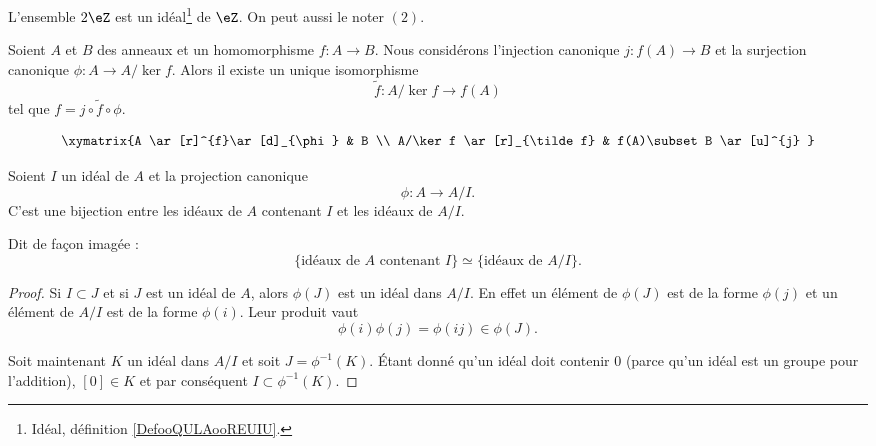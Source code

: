 \begin{lemma}       \label{LEMooQAYSooCYJXkC}
	L'ensemble \( 2\eZ\) est un idéal\footnote{Idéal, définition \ref{DefooQULAooREUIU}.} de \( \eZ\). On peut aussi le noter \( (2) \).
\end{lemma}

\begin{proposition}   \label{PROPooJALPooHFIObB}
	Soient \( A\) et \( B\) des anneaux et un homomorphisme \( f\colon A\to B\). Nous considérons l'injection canonique \( j\colon f(A)\to B\) et la surjection canonique \( \phi\colon A\to A/\ker f\). Alors il existe un unique isomorphisme
	\begin{equation}
		\tilde f \colon A/\ker f\to f(A)
	\end{equation}
	tel que \( f=j\circ\tilde f\circ\phi\).

	\begin{equation}
		\xymatrix{%
			A \ar[r]^{f}\ar[d]_{\phi}       &   B                         \\
			A/\ker f    \ar[r]_{\tilde f}   &   f(A)\subset B \ar[u]^{j}
		}
	\end{equation}
\end{proposition}

\begin{proposition}     \label{PropIJJIdsousphi}
	Soient \( I\) un idéal de \( A\) et la projection canonique
	\begin{equation}
		\phi\colon A\to A/I.
	\end{equation}
	C'est une bijection entre les idéaux de \( A\) contenant \( I\) et les idéaux de \( A/I\).

	Dit de façon imagée :
	\begin{equation}        \label{EqKbrizu}
		\{ \text{idéaux de } A\text{ contenant } I\}\simeq\{ \text{idéaux de } A/I \}.
	\end{equation}
\end{proposition}

\begin{proof}
	Si \( I\subset J\) et si \( J \) est un idéal de \( A\), alors \( \phi(J)\) est un idéal dans \( A/I\). En effet un élément de \( \phi(J)\) est de la forme \( \phi(j)\) et un élément de \( A/I\) est de la forme \( \phi(i)\). Leur produit vaut
	\begin{equation}
		\phi(i)\phi(j)=\phi(ij)\in\phi(J).
	\end{equation}

	Soit maintenant \( K\) un idéal dans \( A/I\) et soit \( J=\phi^{-1}(K)\). Étant donné qu'un idéal doit contenir \( 0\) (parce qu'un idéal est un groupe pour l'addition), \( [0]\in K\) et par conséquent \( I\subset\phi^{-1}(K)\).
\end{proof}

